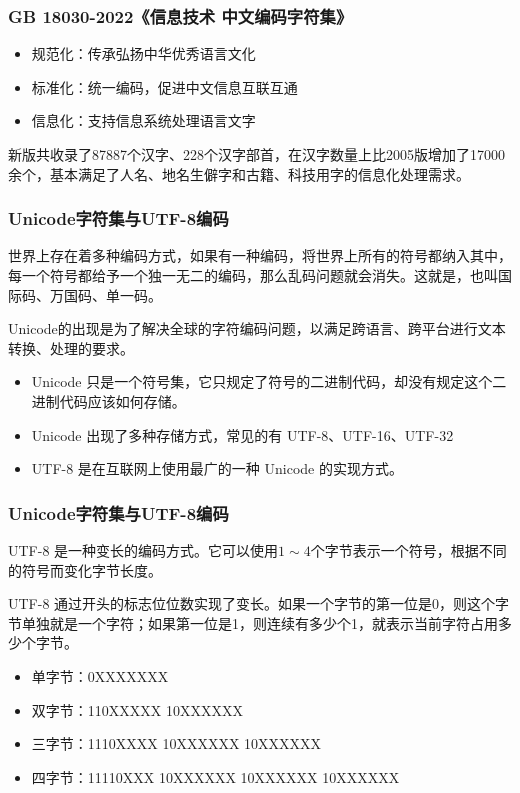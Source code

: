 \begin{frame}
    \frametitle{GB 18030-2022《信息技术 中文编码字符集》}
    \begin{itemize}
      \item 规范化：传承弘扬中华优秀语言文化
      \item 标准化：统一编码，促进中文信息互联互通
      \item 信息化：支持信息系统处理语言文字
    \end{itemize}
    新版共收录了87887个汉字、228个汉字部首，在汉字数量上比2005版增加了17000余个，基本满足了人名、地名生僻字和古籍、科技用字的信息化处理需求。
\end{frame}

\begin{frame}
    \frametitle{Unicode字符集与UTF-8编码}
    世界上存在着多种编码方式，如果有一种编码，将世界上所有的符号都纳入其中，每一个符号都给予一个独一无二的编码，那么乱码问题就会消失。这就是，也叫国际码、万国码、单一码。

    Unicode的出现是为了解决全球的字符编码问题，以满足跨语言、跨平台进行文本转换、处理的要求。
    \begin{itemize}
      \item Unicode 只是一个符号集，它只规定了符号的二进制代码，却没有规定这个二进制代码应该如何存储。
      \item Unicode 出现了多种存储方式，常见的有 UTF-8、UTF-16、UTF-32
      \item UTF-8 是在互联网上使用最广的一种 Unicode 的实现方式。
    \end{itemize}
\end{frame}

\begin{frame}
    \frametitle{Unicode字符集与UTF-8编码}
    UTF-8 是一种变长的编码方式。它可以使用$1\sim 4$个字节表示一个符号，根据不同的符号而变化字节长度。

    UTF-8 通过开头的标志位位数实现了变长。如果一个字节的第一位是0，则这个字节单独就是一个字符；如果第一位是1，则连续有多少个1，就表示当前字符占用多少个字节。
    \begin{itemize}
      \item 单字节：{\ttfamily 0XXXXXXX}
      \item 双字节：{\ttfamily 110XXXXX 10XXXXXX}
      \item 三字节：{\ttfamily 1110XXXX 10XXXXXX 10XXXXXX}
      \item 四字节：{\ttfamily 11110XXX 10XXXXXX 10XXXXXX 10XXXXXX}
    \end{itemize}
\end{frame}

